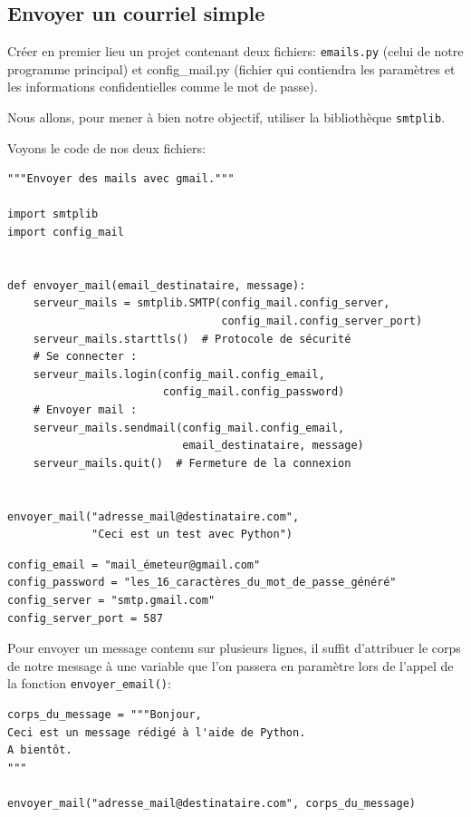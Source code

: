 \documentclass[a4paper,12pt]{book}
\begin{document}
\subsection*{Envoyer un courriel simple}
Créer en premier lieu un projet contenant deux fichiers: \texttt{emails.py} (celui de notre programme principal) et config\_mail.py (fichier qui contiendra les paramètres et les informations confidentielles comme le mot de passe).
\medskip

Nous allons, pour mener à bien notre objectif, utiliser la bibliothèque \texttt{smtplib}.
\medskip

Voyons le code de nos deux fichiers:
\begin{lstlisting}[caption=\texttt{mails.py}]
"""Envoyer des mails avec gmail."""

import smtplib
import config_mail


def envoyer_mail(email_destinataire, message):
    serveur_mails = smtplib.SMTP(config_mail.config_server,
                                 config_mail.config_server_port)
    serveur_mails.starttls()  # Protocole de sécurité
    # Se connecter :
    serveur_mails.login(config_mail.config_email, 
                        config_mail.config_password)
    # Envoyer mail :
    serveur_mails.sendmail(config_mail.config_email, 
                           email_destinataire, message)
    serveur_mails.quit()  # Fermeture de la connexion


envoyer_mail("adresse_mail@destinataire.com", 
             "Ceci est un test avec Python")
\end{lstlisting}
\medskip

\begin{lstlisting}[caption=\texttt{config\_mail.py}]
config_email = "mail_émeteur@gmail.com"
config_password = "les_16_caractères_du_mot_de_passe_généré"
config_server = "smtp.gmail.com"
config_server_port = 587
\end{lstlisting}
\medskip

Pour envoyer un message contenu sur plusieurs lignes, il suffit d'attribuer le corps de notre message à une variable que l'on passera en paramètre lors de l'appel de la fonction \texttt{envoyer\_email()}:
\begin{lstlisting}[caption=Message sur plusieurs lignes]
corps_du_message = """Bonjour,
Ceci est un message rédigé à l'aide de Python.
A bientôt.
"""

envoyer_mail("adresse_mail@destinataire.com", corps_du_message)
\end{lstlisting}
\medskip
\end{document}
